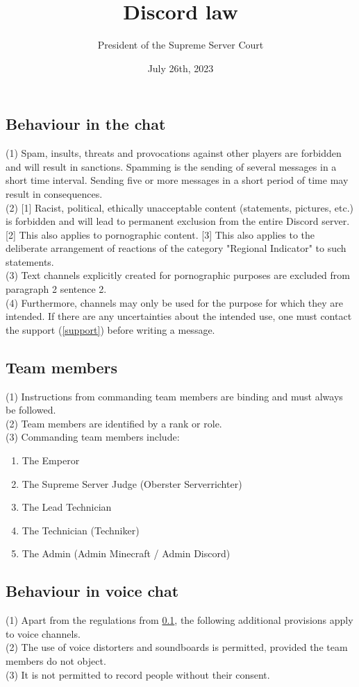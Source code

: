 \documentclass{article}
\title{Discord law}
\author{President of the Supreme Server Court}
\date{July 26th, 2023}
\begin{document}
\maketitle
\newpage
\tableofcontents
\newpage
\subsection{Behaviour in the chat}\label{verhalten}
(1) Spam, insults, threats and provocations against other players are forbidden and will result in sanctions. Spamming is the sending of several messages in a short time interval. Sending five or more messages in a short period of time may result in consequences.\\
(2) [1] Racist, political, ethically unacceptable content (statements, pictures, etc.) is forbidden and will lead to permanent exclusion from the entire Discord server. [2] This also applies to pornographic content. [3] This also applies to the deliberate arrangement of reactions of the category "Regional Indicator" to such statements.\\
(3) Text channels explicitly created for pornographic purposes are excluded from paragraph 2 sentence 2.\\
(4) Furthermore, channels may only be used for the purpose for which they are intended. If there are any uncertainties about the intended use, one must contact the support (\ref{support}) before writing a message.

\subsection{Team members}\label{members}
(1) Instructions from commanding team members are binding and must always be followed.\\
(2) Team members are identified by a rank or role.\\
(3) Commanding team members include:
\begin{enumerate}
	\item The Emperor
	\item The Supreme Server Judge (Oberster Serverrichter)
	\item The Lead Technician
	\item The Technician (Techniker)
	\item The Admin (Admin Minecraft / Admin Discord)
\end{enumerate}

\subsection{Behaviour in voice chat}
(1) Apart from the regulations from \ref{verhalten}, the following additional provisions apply to voice channels.\\
(2) The use of voice distorters and soundboards is permitted, provided the team members do not object.\\
(3) It is not permitted to record people without their consent.
\end{document}
